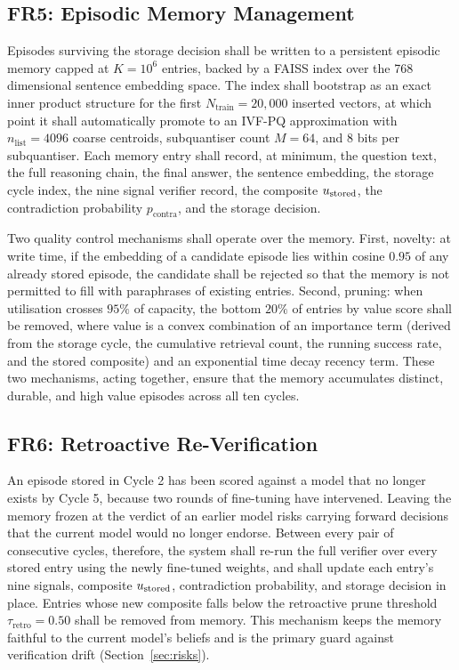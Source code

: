 \subsection{FR5: Episodic Memory Management}
\label{sec:fr5}

Episodes surviving the storage decision shall be written to a persistent episodic memory capped at $K = 10^{6}$ entries, backed by a FAISS index over the 768 dimensional sentence embedding space. The index shall bootstrap as an exact inner product structure for the first $N_{\text{train}} = 20{,}000$ inserted vectors, at which point it shall automatically promote to an IVF-PQ approximation with $n_{\text{list}} = 4096$ coarse centroids, subquantiser count $M = 64$, and $8$ bits per subquantiser. Each memory entry shall record, at minimum, the question text, the full reasoning chain, the final answer, the sentence embedding, the storage cycle index, the nine signal verifier record, the composite $u_{\text{stored}}$, the contradiction probability $p_{\text{contra}}$, and the storage decision.

Two quality control mechanisms shall operate over the memory. First, novelty: at write time, if the embedding of a candidate episode lies within cosine $0.95$ of any already stored episode, the candidate shall be rejected so that the memory is not permitted to fill with paraphrases of existing entries. Second, pruning: when utilisation crosses $95\%$ of capacity, the bottom $20\%$ of entries by value score shall be removed, where value is a convex combination of an importance term (derived from the storage cycle, the cumulative retrieval count, the running success rate, and the stored composite) and an exponential time decay recency term. These two mechanisms, acting together, ensure that the memory accumulates distinct, durable, and high value episodes across all ten cycles.

\subsection{FR6: Retroactive Re-Verification}
\label{sec:fr6}

An episode stored in Cycle 2 has been scored against a model that no longer exists by Cycle 5, because two rounds of fine-tuning have intervened. Leaving the memory frozen at the verdict of an earlier model risks carrying forward decisions that the current model would no longer endorse. Between every pair of consecutive cycles, therefore, the system shall re-run the full verifier over every stored entry using the newly fine-tuned weights, and shall update each entry's nine signals, composite $u_{\text{stored}}$, contradiction probability, and storage decision in place. Entries whose new composite falls below the retroactive prune threshold $\tau_{\text{retro}} = 0.50$ shall be removed from memory. This mechanism keeps the memory faithful to the current model's beliefs and is the primary guard against verification drift (Section~\ref{sec:risks}).

